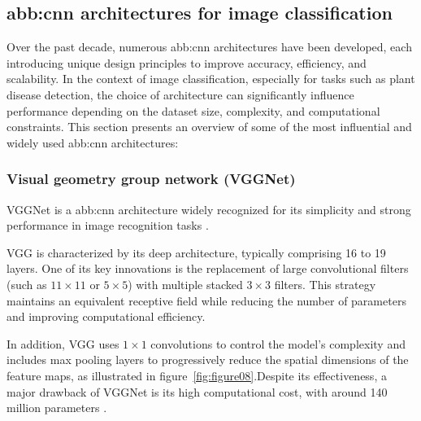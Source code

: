 


\subsection{\gls{abb:cnn} architectures for image classification}
Over the past decade, numerous \gls{abb:cnn} architectures have been developed, each introducing unique design principles to improve accuracy, efficiency, and scalability. In the context of image classification, especially for tasks such as plant disease detection, the choice of architecture can significantly influence performance depending on the dataset size, complexity, and computational constraints.
This section presents an overview of some of the most influential and widely used \gls{abb:cnn} architectures:
\subsubsection{Visual geometry group network (VGGNet)}
VGGNet is a \gls{abb:cnn} architecture widely recognized for its simplicity and strong performance in image recognition tasks \parencite{alzubaidi2021review}.

VGG is characterized by its deep architecture, typically comprising 16 to 19 layers. One of its key innovations is the replacement of large convolutional filters (such as $11 \times 11$ or $5 \times 5$) with multiple stacked $3 \times 3$ filters. This strategy maintains an equivalent receptive field while reducing the number of parameters and improving computational efficiency.

In addition, VGG uses $1 \times 1$ convolutions to control the model’s complexity and includes max pooling layers to progressively reduce the spatial dimensions of the feature maps, as illustrated in figure~\ref{fig:figure08}.Despite its effectiveness, a major drawback of VGGNet is its high computational cost, with around 140 million parameters \parencite{alzubaidi2021review}. 


